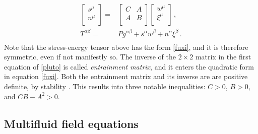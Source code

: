 \documentclass[a4paper, amsfonts, amssymb, amsmath, reprint, showkeys, nofootinbib, twoside, onecolumn, notitlepage]{revtex4-1}
\begin{document}
\begin{equation}\label{pluto}
\begin{split}
\begin{bmatrix}
s^\mu \\
n^\mu \\
\end{bmatrix}
={}&  
\begin{bmatrix}
C & A \\
A & B \\
\end{bmatrix}
\begin{bmatrix}
w^\mu \\
\xi^\mu \\
\end{bmatrix} \, , \\
T^{\alpha \beta} = {}& Pg^{\alpha \beta} + s^\alpha w^\beta + n^\alpha \xi^\beta \, . \\
\end{split}
\end{equation} 
Note that the stress-energy tensor above has the form \eqref{fuxi}, and it is therefore symmetric, even if not manifestly so. The inverse of the $2\times 2$ matrix in the first equation of \eqref{pluto} is called \textit{entrainment matrix}, and it enters the quadratic form in equation \eqref{fuxi}. Both the entrainment matrix and its inverse are are positive definite, by stability \cite{GavassinoStabilityCarter2022}. This results into three notable inequalities: $C>0$, $B>0$, and $CB-A^2>0$.


\subsection{Multifluid field equations}
\end{document}
